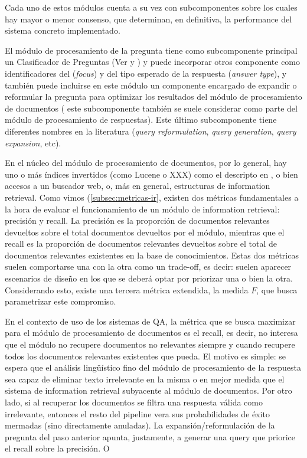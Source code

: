 Cada uno de estos módulos cuenta a su vez con subcomponentes sobre los cuales hay mayor o menor consenso, que determinan, en definitiva, la performance del sistema concreto implementado. 

El módulo de procesamiento de la pregunta tiene como subcomponente principal un Clasificador de Preguntas (Ver  y ) y puede incorporar otros componente como identificadores del  (\textit{focus}) y del tipo esperado de la respuesta (\textit{answer type}), y también puede incluirse en este módulo un componente encargado de expandir o reformular la pregunta para optimizar los resultados del módulo de procesamiento de documentos ( este subcomponente también se suele considerar como parte del módulo de procesamiento de respuestas). Este último subcomponente tiene diferentes nombres en la literatura (\textit{query reformulation}, \textit{query generation}, \textit{query expansion}, etc).

En el núcleo del módulo de procesamiento de documentos, por lo general, hay uno o más índices invertidos (como Lucene o {\color{red} XXX}) como el descripto en , o bien accesos a un buscador web, o, más en general, estructuras de information retrieval. Como vimos (\ref{subsec:metricas-ir}, existen dos métricas fundamentales a la hora de evaluar el funcionamiento de un módulo de information retrieval: precisión y recall. La precisión es la proporción de documentos relevantes devueltos sobre el total documentos devueltos por el módulo, mientras que el recall es la proporción de documentos relevantes devueltos sobre el total de documentos relevantes existentes en la base de conocimientos. Estas dos métricas suelen comportarse una con la otra como un trade-off, es decir: suelen aparecer escenarios de diseño en los que se deberá optar por priorizar una o bien la otra. Considerando esto, existe una tercera métrica extendida, la medida $F$, que busca parametrizar este compromiso. 

En el contexto de uso de los sistemas de QA, la métrica que se busca maximizar para el módulo de procesamiento de documentos es el recall, es decir, no interesa que el módulo no recupere documentos no relevantes siempre y cuando recupere todos los documentos relevantes existentes que pueda. El motivo es simple: se espera que el análisis lingüístico fino del módulo de procesamiento de la respuesta sea capaz de eliminar texto irrelevante en la misma o en mejor medida que el sistema de information retrieval subyacente al módulo de documentos. Por otro lado, si al recuperar los documentos se filtra una respuesta válida como irrelevante, entonces el resto del pipeline vera sus probabilidades de éxito mermadas (sino directamente anuladas).  La expansión/reformulación de la pregunta del paso anterior apunta, justamente, a generar una query que priorice el recall sobre la precisión. O

